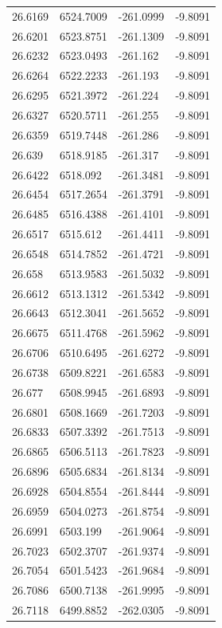 \begin{table}[H]
\begin{tabular}{llll}
26.6169 & 6524.7009 & -261.0999 & -9.8091 \\
26.6201 & 6523.8751 & -261.1309 & -9.8091 \\
26.6232 & 6523.0493 & -261.162 & -9.8091 \\
26.6264 & 6522.2233 & -261.193 & -9.8091 \\
26.6295 & 6521.3972 & -261.224 & -9.8091 \\
26.6327 & 6520.5711 & -261.255 & -9.8091 \\
26.6359 & 6519.7448 & -261.286 & -9.8091 \\
26.639 & 6518.9185 & -261.317 & -9.8091 \\
26.6422 & 6518.092 & -261.3481 & -9.8091 \\
26.6454 & 6517.2654 & -261.3791 & -9.8091 \\
26.6485 & 6516.4388 & -261.4101 & -9.8091 \\
26.6517 & 6515.612 & -261.4411 & -9.8091 \\
26.6548 & 6514.7852 & -261.4721 & -9.8091 \\
26.658 & 6513.9583 & -261.5032 & -9.8091 \\
26.6612 & 6513.1312 & -261.5342 & -9.8091 \\
26.6643 & 6512.3041 & -261.5652 & -9.8091 \\
26.6675 & 6511.4768 & -261.5962 & -9.8091 \\
26.6706 & 6510.6495 & -261.6272 & -9.8091 \\
26.6738 & 6509.8221 & -261.6583 & -9.8091 \\
26.677 & 6508.9945 & -261.6893 & -9.8091 \\
26.6801 & 6508.1669 & -261.7203 & -9.8091 \\
26.6833 & 6507.3392 & -261.7513 & -9.8091 \\
26.6865 & 6506.5113 & -261.7823 & -9.8091 \\
26.6896 & 6505.6834 & -261.8134 & -9.8091 \\
26.6928 & 6504.8554 & -261.8444 & -9.8091 \\
26.6959 & 6504.0273 & -261.8754 & -9.8091 \\
26.6991 & 6503.199 & -261.9064 & -9.8091 \\
26.7023 & 6502.3707 & -261.9374 & -9.8091 \\
26.7054 & 6501.5423 & -261.9684 & -9.8091 \\
26.7086 & 6500.7138 & -261.9995 & -9.8091 \\
26.7118 & 6499.8852 & -262.0305 & -9.8091 \\

\end{tabular}
\end{table}
